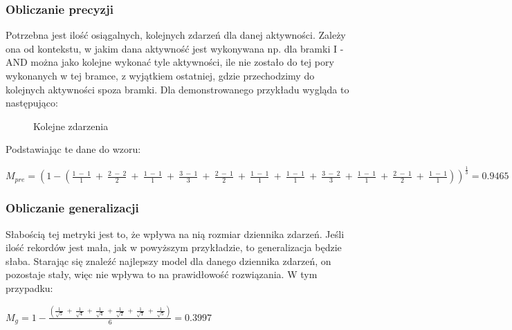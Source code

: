\subsubsection{Obliczanie precyzji}
Potrzebna jest ilość osiągalnych, kolejnych zdarzeń dla danej aktywności. Zależy ona od kontekstu, w jakim dana aktywność jest wykonywana np. dla bramki I - AND można jako kolejne wykonać tyle aktywności, ile nie zostało do tej pory wykonanych w tej bramce, z wyjątkiem ostatniej, gdzie przechodzimy do kolejnych aktywności spoza bramki. Dla demonstrowanego przykładu wygląda to następująco:
\begin{figure}[H]
	\caption{\label{fig:directly-follows}Kolejne zdarzenia}
\end{figure}
Podstawiając te dane do wzoru:
\begin{center}
$M_{pre} = (1 - (\frac{1\ -\ 1}{1}\ +\ \frac{2\ -\ 2}{2}\ +\ \frac{1\ -\ 1}{1}\ +\ \frac{3\ -\ 1}{3}\ +\ \frac{2\ -\ 1}{2}\ +\ \frac{1\ -\ 1}{1}\ +\ \frac{1\ -\ 1}{1}\ +\ \frac{3\ -\ 2}{3}\ +\ \frac{1\ -\ 1}{1}\ +\ \frac{2\ -\ 1}{2}\ +\ \frac{1\ -\ 1}{1}))^{\frac{1}{3}} = 0.9465 $
\end{center}

\subsubsection{Obliczanie generalizacji}
Słabością tej metryki jest to, że wpływa na nią rozmiar dziennika zdarzeń. Jeśli ilość rekordów jest mała, jak w powyższym przykładzie, to generalizacja będzie słaba. Starając się znaleźć najlepszy model dla danego dziennika zdarzeń, on pozostaje stały, więc nie wpływa to na prawidłowość rozwiązania. W tym przypadku:
\begin{center}
$M_g = 1 - \frac{(\frac{1}{\sqrt{5}}\ +\ \frac{1}{\sqrt{4}}\ +\ \frac{1}{\sqrt{4}}\ +\ \frac{1}{\sqrt{2}}\ +\ \frac{1}{\sqrt{1}}\ +\ \frac{1}{\sqrt{5}})}{6} = 0.3997$
\end{center}

